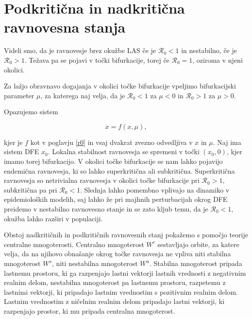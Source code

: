 \documentclass[a4paper,12pt]{article}
\newcommand{\todo}[1]{{\color{red}{#1}}}
\newcommand{\R}{\mathcal R}
\begin{document}
\todo{dokaz}

\section{Podkritična in nadkritična ravnovesna stanja}

Videli smo, da je ravnovesje brez okužbe LAS če je \(\R_0<1\) in nestabilno, če 
je \(\R_0>1\). Težava pa se pojavi v točki bifurkacije, torej če \(\R_0=1\), oziroma
v njeni okolici.

Za lažjo obravnavo dogajanja v okolici točke bifurkacije vpeljimo bifurkacijski parameter
\(\mu\), za katerega naj velja, da je \(\R_0<1\) za \(\mu<0\) in \(\R_0>1\) za \(\mu>0\).

Opazujemo sistem 

\begin{equation}\label{eq4}
\dot{x}=f(x,\mu),
\end{equation}

kjer je \(f\) kot v poglavju \ref{r0} in vsaj dvakrat zvezno odvedljiva v \(x\) in \(\mu\).
Naj ima sistem DFE \(x_0\). Lokalna stabilnost ravnovesja se spremeni v točki \((x_0,0)\), kjer 
imamo torej bifurkacijo. V okolici točke bifurkacije se nam lahko pojavijo endemična 
ravnovesja, ki so lahko superkritična ali subkritična. Superkritična ravnovesja so 
netrivialna \todo{stabilna?} ravnovesja v okolici točke bifurkacije pri \(\R_0>1\),
subkritična pa pri \(\R_0<1\). Slednja lahko pomembno vplivajo na dinamiko v 
epidemioloških modelih, saj lahko že pri majhnih perturbacijah okrog DFE preidemo
v nestabilno ravnovesno stanje in se zato kljub temu, da je \(\R_0<1\), okužba lahko 
razširi v populaciji.

Obstoj nadkritičnih in podkritičnih ravnovesnih stanj pokažemo s pomočjo teorije 
centralne mnogoterosti. Centralno mnogoterost \(W^c\) sestavljajo orbite, za katere velja, da na 
njihovo obnašanje okrog točke ravnovesja ne vpliva niti stabilna mnogoterost \(W^s\), niti nestabilna 
mnogoterost \(W^u\). Stabilna mnogoterost pripada lastnemu prostoru, ki ga razpenjajo lastni vektorji 
lastnih vrednosti z negativnim realnim delom, nestabilna mnogoterost pa lastnemu prostoru, razpetemu z 
lastnimi vektorji, ki pripadajo lastnim vrednostim s pozitivnim realnim delom. Lastnim vrednostim z ničelnim 
realnim delom pripadajo lastni vektorji, ki razpenjajo prostor, ki mu pripada centralna mnogoterost. 
\end{document}
